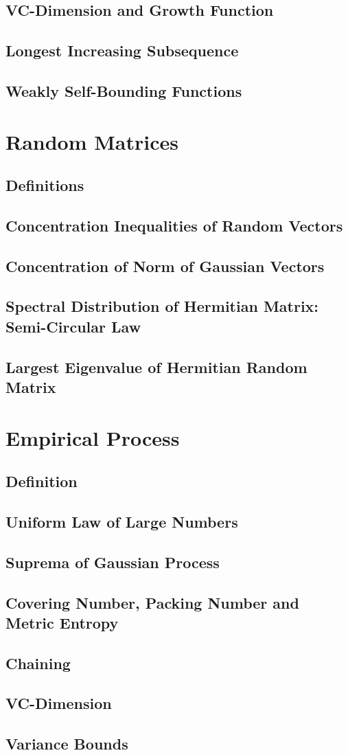 \documentclass[11pt]{article}
\begin{document}
\subsection{VC-Dimension and Growth Function}
\subsection{Longest Increasing Subsequence}
\subsection{Weakly Self-Bounding Functions}


\section{Random Matrices}
\subsection{Definitions}
\subsection{Concentration Inequalities of Random Vectors}
\subsection{Concentration of Norm of Gaussian Vectors}
\subsection{Spectral Distribution of Hermitian Matrix: Semi-Circular Law}
\subsection{Largest Eigenvalue of  Hermitian Random Matrix}


\section{Empirical Process}
\subsection{Definition}
\subsection{Uniform Law of Large Numbers}
\subsection{Suprema of Gaussian Process}
\subsection{Covering Number, Packing Number and Metric Entropy}
\subsection{Chaining}
\subsection{VC-Dimension}
\subsection{Variance Bounds}




\newpage


\end{document}
